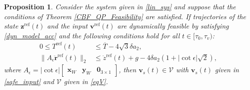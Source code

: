 \documentclass[journal,10pt]{IEEEtran}
\newtheorem{proposition}{\bfseries Proposition}%
\newcommand{\vect}[1]{\boldsymbol{\mathbf{#1}}}
\newcommand{\mat}[1]{\begin{bmatrix} #1 \end{bmatrix}}
\newif\ifdraft
\newcommand{\XX}[1]{\ifdraft{\color{red}[{\bf XX}: #1]}\fi}
\newcommand{\VF}[1]{\ifdraft{\color{blue}[{\bf VF}: #1]}\fi}
\begin{document}
\begin{proposition} \label{input_safeguard_prop}
Consider the system given in \eqref{lin_sys} and suppose that the conditions of Theorem \ref{CBF_QP_Feasibility} are satisfied. If trajectories of the state $\vect{z}^{\text{ref}}(t)$ and the input $\vect{v}^{\text{ref}}(t)$ are dynamically feasible by satisfying \eqref{dyn_model_acc}  and 
the following conditions hold for all $t\in[\tau_0,\tau_v)$:
\begin{subequations} \label{sat_safeguard_cst}
\begin{align}
0\leq T^{\text{ref}}(t) &\leq \overline{T} - 4\sqrt{3}\delta a_2,\label{satprop_T}\\
\|A_{\epsilon}\ddot{\vect{r}}^{\text{ref}}(t)\|_2&\leq \ddot{z}^{\text{ref}}(t) +g -4\delta a_2(1+|\cot\epsilon|\sqrt{2}),\label{satprop_eul}
\end{align}
\end{subequations}
where $A_{\epsilon} =|\cot\epsilon|\mat{\vect{x}_W & \vect{y}_W & \vect{0}_{3\times 1}}$, then $\vect{v}_s(t)\in\mathcal{V}$ with $\vect{v}_s(t)$ given in \eqref{safe_input} and $\mathcal{V}$ given in \eqref{eqV}.
\end{proposition}
\end{document}
